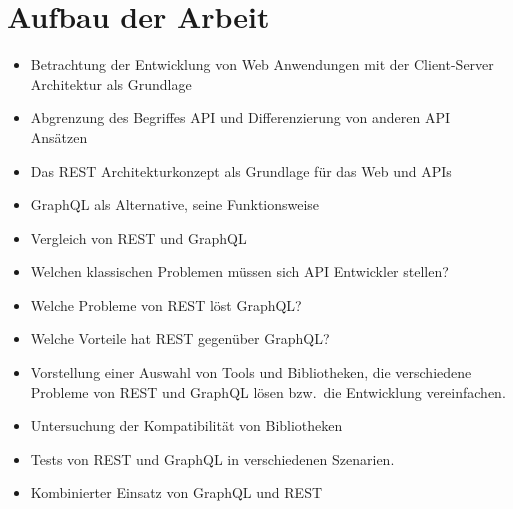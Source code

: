 \section{Aufbau der Arbeit}
\begin{itemize}
  \item Betrachtung der Entwicklung von Web Anwendungen mit der Client-Server Architektur als Grundlage
  \item Abgrenzung des Begriffes API und Differenzierung von anderen API Ansätzen
  \item Das REST Architekturkonzept als Grundlage für das Web und APIs
  \item GraphQL als Alternative, seine Funktionsweise
  \item Vergleich von REST und GraphQL
  \item Welchen klassischen Problemen müssen sich API Entwickler stellen?
  \item Welche Probleme von REST löst GraphQL\@?
  \item Welche Vorteile hat REST gegenüber GraphQL\@?
  \item Vorstellung einer Auswahl von Tools und Bibliotheken, die verschiedene Probleme von REST und GraphQL lösen bzw.\ die Entwicklung vereinfachen.
  \item Untersuchung der Kompatibilität von Bibliotheken
  \item Tests von REST und GraphQL in verschiedenen Szenarien.
  \item Kombinierter Einsatz von GraphQL und REST
\end{itemize}